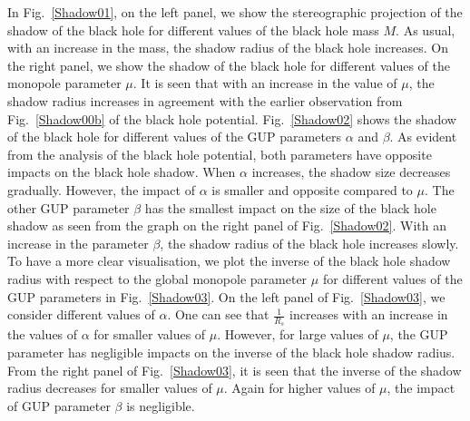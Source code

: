 \documentclass[aps,amsmath,amssymb,showpacs,showkeys]{revtex4}
\begin{document}
In Fig.\ \ref{Shadow01}, on the left panel, we show the stereographic 
projection of the shadow of the black hole for different values of the black 
hole mass $M$. As usual, with an increase in the mass, the shadow radius of 
the black hole increases. On the right panel, we show the shadow of the 
black hole for different values of the monopole parameter $\mu$. It is seen 
that with an increase in the value of $\mu$, the shadow radius increases in
agreement with the earlier observation from Fig.\ \ref{Shadow00b} of the
black hole potential.
Fig.\ \ref{Shadow02} shows the shadow of the black hole for different values 
of the GUP parameters $\alpha$ and $\beta$. As evident from the analysis of 
the black hole potential, both parameters have opposite impacts on the black 
hole shadow. When $\alpha$ increases, the shadow size decreases gradually. 
However, the impact of $\alpha$ is smaller and opposite compared to $\mu$. 
The other GUP parameter $\beta$ has the smallest impact on the size of the 
black hole shadow as seen from the graph on the right panel of 
Fig.\ \ref{Shadow02}. With an increase in the parameter $\beta$, the shadow 
radius of the black hole increases slowly. To have a more clear visualisation, 
we plot the inverse of the black hole shadow radius with respect to 
the global monopole parameter $\mu$ for different values of the GUP parameters 
in Fig.\ \ref{Shadow03}. On the left panel of Fig.\ \ref{Shadow03}, we  
consider different values of $\alpha$. One can see that $\frac{1}{R_s}$ 
increases with an increase in the values of $\alpha$ for smaller values of 
$\mu$. However, for large values of $\mu$, the GUP parameter has negligible 
impacts on the inverse of the black hole shadow radius. From the right panel 
of Fig.\ \ref{Shadow03}, it is seen that the inverse of the shadow radius 
decreases for smaller values of $\mu$. Again for higher values of 
$\mu$, the impact of GUP parameter $\beta$ is negligible.
\end{document}
